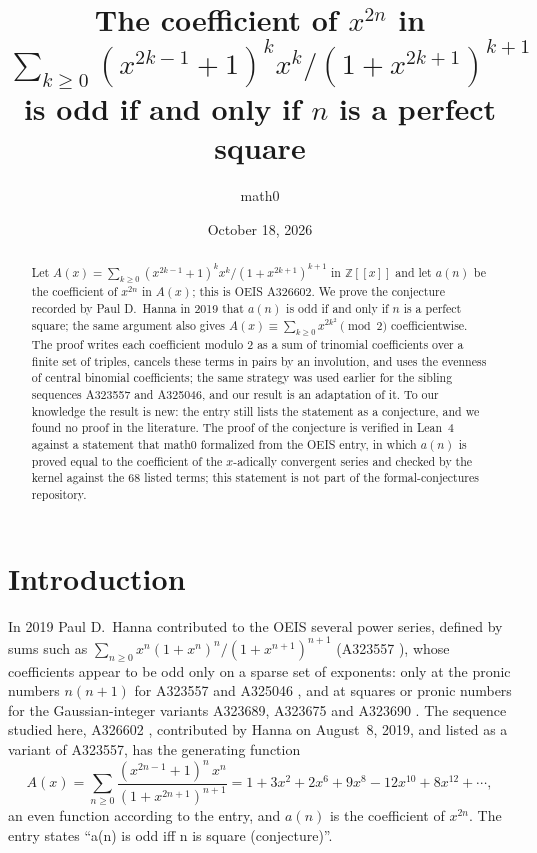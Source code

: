 \documentclass[11pt]{amsart}
\title[Hanna's parity conjecture for OEIS A326602]{The coefficient of $x^{2n}$ in $\sum_{k\ge 0}(x^{2k-1}+1)^k x^k/(1+x^{2k+1})^{k+1}$ is odd if and only if $n$ is a perfect square}
\author{math0}
\date{October 18, 2026}
\theoremstyle{plain}
\theoremstyle{definition}
\newcommand{\ZX}{\mathbb{Z}[[x]]}
\begin{document}
\begin{abstract}
Let $A(x)=\sum_{k\ge0}(x^{2k-1}+1)^k x^k/(1+x^{2k+1})^{k+1}$ in $\ZX$ and let $a(n)$ be the coefficient of $x^{2n}$ in $A(x)$; this is OEIS A326602.
We prove the conjecture recorded by Paul D.~Hanna in 2019 that $a(n)$ is odd if and only if $n$ is a perfect square; the same argument also gives $A(x)\equiv\sum_{k\ge0}x^{2k^2}\pmod 2$ coefficientwise.
The proof writes each coefficient modulo $2$ as a sum of trinomial coefficients over a finite set of triples, cancels these terms in pairs by an involution, and uses the evenness of central binomial coefficients; the same strategy was used earlier for the sibling sequences A323557 and A325046, and our result is an adaptation of it.
To our knowledge the result is new: the entry still lists the statement as a conjecture, and we found no proof in the literature.
The proof of the conjecture is verified in Lean~4 against a statement that math0 formalized from the OEIS entry, in which $a(n)$ is proved equal to the coefficient of the $x$-adically convergent series and checked by the kernel against the $68$ listed terms; this statement is not part of the formal-conjectures repository.
\end{abstract}
\maketitle

\section{Introduction}

In 2019 Paul D.~Hanna contributed to the OEIS several power series, defined by sums such as $\sum_{n\ge0}x^n(1+x^n)^n/(1+x^{n+1})^{n+1}$ (A323557 \cite{A323557}), whose coefficients appear to be odd only on a sparse set of exponents: only at the pronic numbers $n(n+1)$ for A323557 and A325046 \cite{A325046}, and at squares or pronic numbers for the Gaussian-integer variants A323689, A323675 and A323690 \cite{A323689,A323675,A323690}.
The sequence studied here, A326602 \cite{A326602}, contributed by Hanna on August~8, 2019, and listed as a variant of A323557, has the generating function
\[
  A(x)=\sum_{n\ge0}\frac{(x^{2n-1}+1)^n\,x^n}{(1+x^{2n+1})^{n+1}}=1+3x^2+2x^6+9x^8-12x^{10}+8x^{12}+\cdots,
\]
an even function according to the entry, and $a(n)$ is the coefficient of $x^{2n}$. The entry states ``a(n) is odd iff n is square (conjecture)''.
\end{document}
